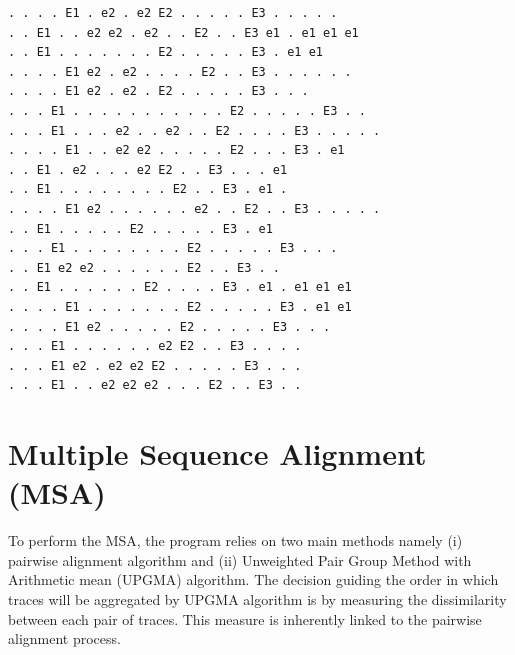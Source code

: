 \documentclass[12pt,a4paper]{article}
\begin{document}
\begin{lstlisting}[caption={Traces generated from expression (2-3)E1$<$(4-8)e2X10$|$E2\%25$>$E2(2-4)E3$<$(2-5)e1\%40$>$}]
. . . . E1 . e2 . e2 E2 . . . . . E3 . . . . .
. . E1 . . e2 e2 . e2 . . E2 . . E3 e1 . e1 e1 e1
. . E1 . . . . . . . E2 . . . . . E3 . e1 e1
. . . . E1 e2 . e2 . . . . E2 . . E3 . . . . . .
. . . . E1 e2 . e2 . E2 . . . . . E3 . . .
. . . E1 . . . . . . . . . . . E2 . . . . . E3 . .
. . . E1 . . . e2 . . e2 . . E2 . . . . E3 . . . . .
. . . . E1 . . e2 e2 . . . . . E2 . . . E3 . e1
. . E1 . e2 . . . e2 E2 . . E3 . . . e1
. . E1 . . . . . . . . E2 . . E3 . e1 .
. . . . E1 e2 . . . . . . e2 . . E2 . . E3 . . . . .
. . E1 . . . . . E2 . . . . . E3 . e1
. . . E1 . . . . . . . . E2 . . . . . E3 . . .
. . E1 e2 e2 . . . . . . E2 . . E3 . .
. . E1 . . . . . . E2 . . . . E3 . e1 . e1 e1 e1
. . . . E1 . . . . . . . E2 . . . . . E3 . e1 e1
. . . . E1 e2 . . . . . E2 . . . . . E3 . . .
. . . E1 . . . . . . e2 E2 . . E3 . . . .
. . . E1 e2 . e2 e2 E2 . . . . . E3 . . .
. . . E1 . . e2 e2 e2 . . . E2 . . E3 . .
\end{lstlisting}




\section{Multiple Sequence Alignment (MSA)}


To perform the MSA, the program relies on two main methods namely (i) pairwise alignment algorithm and (ii) Unweighted Pair Group Method with Arithmetic mean (UPGMA) algorithm.
The decision guiding the order in which traces will be aggregated by UPGMA algorithm is by measuring the dissimilarity between each pair of traces. This measure is inherently linked to the pairwise alignment process.
\end{document}
